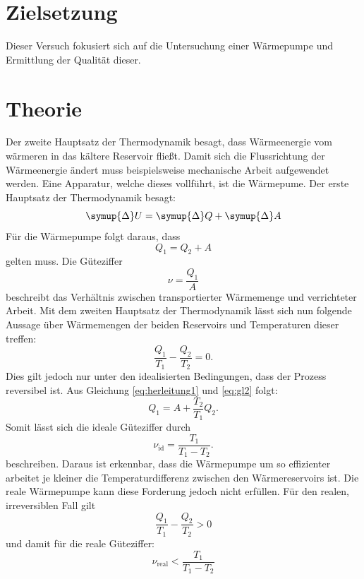 \section{Zielsetzung}
Dieser Versuch fokusiert sich auf die Untersuchung einer Wärmepumpe und Ermittlung der Qualität dieser.
\section{Theorie}
\label{sec:Theorie}
Der zweite Hauptsatz der Thermodynamik besagt, dass Wärmeenergie vom wärmeren in das kältere Reservoir fließt.
Damit sich die Flussrichtung der Wärmeenergie ändert muss beispielsweise mechanische Arbeit aufgewendet werden.
Eine Apparatur, welche dieses vollführt, ist die Wärmepume.
Der erste Hauptsatz der Thermodynamik besagt:
\begin{equation}
	\symup{\Delta} U = \symup{\Delta} Q + \symup{\Delta} A
\end{equation}
Für die Wärmepumpe folgt daraus, dass
\begin{equation}
	\label{eq:herleitung1}
	Q_1 = Q_2 + A
\end{equation}
gelten muss.
Die Güteziffer
%
\begin{equation}
	\label{eq:gl1}
	\nu=\frac{Q_1}{A}
\end{equation}
%
beschreibt das Verhältnis zwischen transportierter Wärmemenge und verrichteter Arbeit.
Mit dem zweiten Hauptsatz der Thermodynamik lässt sich nun folgende Aussage über Wärmemengen der beiden Reservoirs und Temperaturen dieser treffen:
\begin{equation}
		\label{eq:gl2}
	\frac{Q_1}{T_1}-\frac{Q_2}{T_2}=0.
\end{equation}
Dies gilt jedoch nur unter den idealisierten Bedingungen, dass der Prozess reversibel ist.
Aus Gleichung \eqref{eq:herleitung1} und \eqref{eq:gl2} folgt:
\begin{equation}
	Q_1 = A + \frac{T_2}{T_1} Q_2 .
\end{equation}
Somit lässt sich die ideale Güteziffer durch
\begin{equation}
	\nu_{\text{id}}=\frac{T_1}{T_1-T_2}.
	\label{eq:guetezifferideal}
\end{equation}
beschreiben.
Daraus ist erkennbar, dass die Wärmepumpe um so effizienter arbeitet je kleiner die Temperaturdifferenz zwischen den Wärmereservoirs ist.
Die reale Wärmepumpe kann diese Forderung jedoch nicht erfüllen.
Für den realen, irreversiblen Fall gilt
\begin{equation}
		\label{eq:gl3}
	\frac{Q_1}{T_1}-\frac{Q_2}{T_2}>0
\end{equation}
und damit für die reale Güteziffer:
\begin{equation}
\nu_{\text{real}} < \frac{T_1}{T_1-T_2}
\end{equation}

